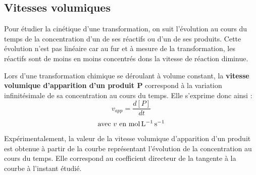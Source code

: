 \documentclass[a4paper,13pt,fleqn]{scrartcl}%
\begin{document}
    \subsection{Vitesses volumiques}
    Pour étudier la cinétique d'une transformation, on suit l'évolution au cours du temps de la concentration d'un de ses réactifs ou d'un de ses produits. Cette évolution n'est pas linéaire car au fur et à mesure de la transformation, les réactifs sont de moins en moins concentrés dons la vitesse de réaction diminue.\\
    \begin{minipage}{.5\linewidth}
    Lors d'une transformation chimique se déroulant à volume constant, la \textbf{vitesse volumique d'apparition d'un produit P} correspond à la variation infinitésimale de sa concentration au cours du temps. Elle s'exprime donc ainsi :
    $$v_{app}=\dfrac{d[P]}{dt}$$
    $$\text{avec $v$ en \unit{\mole\per\liter\per\second}}$$
    Expérimentalement, la valeur de la vitesse volumique d'apparition d'un produit est obtenue à partir de la courbe représentant l'évolution de la concentration au cours du temps. Elle correspond au coefficient directeur de la tangente à la courbe à l'instant étudié.\\
    \end{minipage}
    \begin{minipage}{.5\linewidth}
    \centering
    \end{minipage}
    
\end{document}
